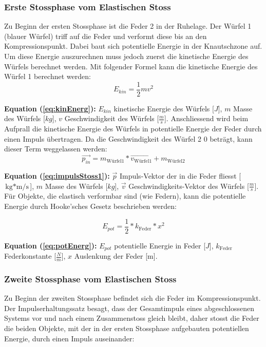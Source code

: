 \documentclass{article}
\begin{document}
\subsubsection{Erste Stossphase vom Elastischen Stoss}
Zu Beginn der ersten Stossphase ist die Feder 2 in der Ruhelage. Der Würfel 1 (blauer Würfel) triff auf die Feder und verformt diese bis an den Kompressionspunkt. Dabei baut sich potentielle Energie in der Knautschzone auf.
Um diese Energie auszurechnen muss jedoch zuerst die kinetische Energie des Würfels berechnet werden.
\newline
Mit folgender Formel kann die kinetische Energie des Würfel 1 berechnet werden:
\begin{equation}\label{eq:kinEnerg}
E_{kin} = \frac{1}{2} mv^2
\end{equation}

\scriptsize
\textbf{Equation (\ref{eq:kinEnerg}):} $E_{kin}$ kinetische Energie des Würfels [$J$], $m$ Masse des Würfels [$kg$], $v$ Geschwindigkeit des Würfels [$\frac{m}{s}$].
\normalsize
\medskip
\newline
Anschliessend wird beim Aufprall die kinetische Energie des Würfels in potentielle Energie der Feder durch einen Impuls übertragen. Da die Geschwindigkeit des Würfel 2 0 beträgt, kann dieser Term weggelassen werden:
\begin{equation}\label{eq:impulsStoss1}
\vec{p_{in}} = m_{\text{Würfel1}} * \vec{v_{\text{Würfel1}}} + m_{\text{Würfel2}}
\end{equation}

\scriptsize
\textbf{Equation (\ref{eq:impulsStoss1}):} $\vec{p}$ Impuls-Vektor der in die Feder fliesst [$\text{kg} *\text{m/s}$], $m$ Masse des Würfels [$kg$], $\vec{v}$ Geschwindigkeits-Vektor des Würfels [$\frac{m}{s}$].
\normalsize
\medskip
\newline
Für Objekte, die elastisch verformbar sind (wie Federn), kann die potentielle Energie durch Hooke'sches Gesetz beschrieben werden:

\begin{equation}\label{eq:potEnerg}
E_{pot} = \frac{1}{2} *  k_{\text{Feder}} * x^2
\end{equation}

\scriptsize
\textbf{Equation (\ref{eq:potEnerg}):} $E_{pot}$ potentielle Energie in Feder [$J$], $k_{\text{Feder}}$ Federkonstante [$\frac{N}{m}$], $x$ Auslenkung der Feder [m].
\normalsize
\medskip

\subsubsection{Zweite Stossphase vom Elastischen Stoss}
Zu Beginn der zweiten Stossphase befindet sich die Feder im Kompressionspunkt. Der Impulserhaltungssatz besagt, dass der Gesamtimpuls eines abgeschlossenen Systems vor und nach einem Zusammenstoss gleich bleibt, daher stosst die Feder die beiden Objekte, mit der in der ersten Stossphase aufgebauten potentiellen Energie, durch einen Impuls auseinander:
\end{document}
